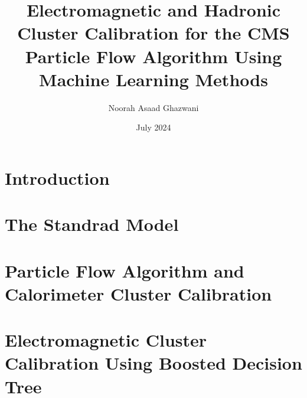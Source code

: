 \documentclass
[
]
{thesis}
\title{Electromagnetic and Hadronic Cluster Calibration for the CMS Particle Flow Algorithm Using Machine Learning Methods}
\author{Noorah Asaad Ghazwani}
\date{July 2024}
\begin{document}

\setlength{\belowdisplayskip}{1ex} \setlength{\belowdisplayshortskip}{1ex}
\setlength{\abovedisplayskip}{1ex} \setlength{\abovedisplayshortskip}{1ex}


\chapter{Introduction}
\label{chapter:ch1}

\chapter{The Standrad Model}
\label{chapter:ch2}

%
\chapter{Particle Flow Algorithm and Calorimeter Cluster Calibration} 
\label{chapter:ch3}

\chapter{Electromagnetic Cluster Calibration Using Boosted Decision Tree}
\label{chapter:ch4}

\end{document}
